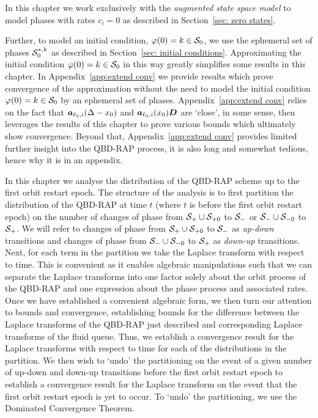 In this chapter we work exclusively with the \emph{augmented state space model} to model phases with rates \(c_i=0\) as described in Section~\ref{sec: zero states}. 

Further, to model an initial condition, \(\varphi(0)=k\in\mathcal{S}_0\), we use the ephemeral set of phases \(\mathcal{S}_0^{*,k}\) as described in Section~\ref{sec: initial conditions}. Approximating the initial condition \(\varphi(0)=k\in\mathcal{S}_0\) in this way greatly simplifies some results in this chapter. In Appendix~\ref{app:extend conv} we provide results which prove convergence of the approximation without the need to model the initial condition \(\varphi(0)=k\in\mathcal{S}_0\) by an ephemeral set of phases. Appendix~\ref{app:extend conv} relies on the fact that \(\boldsymbol a_{\ell_0,i}(\Delta - x_0)\) and \(\boldsymbol a_{\ell_0,i}(x_0)\boldsymbol D\) are `close', in some sense, then leverages the results of this chapter to prove various bounds which ultimately show convergence. Beyond that, Appendix~\ref{app:extend conv} provides limited further insight into the QBD-RAP process, it is also long and somewhat tedious, hence why it is in an appendix. 

In this chapter we analyse the distribution of the QBD-RAP scheme up to the first orbit restart epoch. The structure of the analysis is to first partition the distribution of the QBD-RAP at time \(t\) (where \(t\) is before the first orbit restart epoch) on the number of changes of phase from \(\mathcal{S}_+\cup\mathcal{S}_{+0}\) to \(\mathcal{S}_-\) or \(\mathcal{S}_-\cup\mathcal{S}_{-0}\) to \(\mathcal{S}_+\). We will refer to changes of phase from \(\mathcal{S}_+\cup\mathcal{S}_{+0}\) to \(\mathcal{S}_-\) as \emph{up-down} transitions and changes of phase from \(\mathcal{S}_-\cup\mathcal{S}_{-0}\) to \(\mathcal{S}_+\) as \emph{down-up} transitions. Next, for each term in the partition we take the Laplace transform with respect to time. This is convenient as it enables algebraic manipulations such that we can separate the Laplace transforms into one factor solely about the orbit process of the QBD-RAP and one expression about the phase process and associated rates. Once we have established a convenient algebraic form, we then turn our attention to bounds and convergence, establishing bounds for the difference between the Laplace transforms of the QBD-RAP just described and corresponding Laplace transforms of the fluid queue. Thus, we establish a convergence result for the Laplace transforms with respect to time for each of the distributions in the partition. We then wish to `undo' the partitioning on the event of a given number of up-down and down-up transitions before the first orbit restart epoch to establish a convergence result for the Laplace transform on the event that the first orbit restart epoch is yet to occur. To `undo' the partitioning, we use the Dominated Convergence Theorem. 

